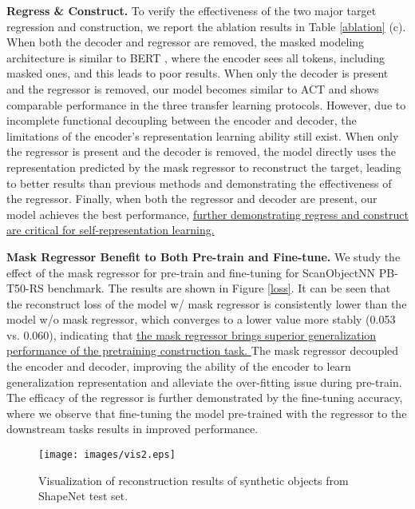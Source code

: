 \documentclass[sigconf, screen]{acmart}
\begin{document}
\noindent \textbf{Regress \& Construct.} 
To verify the effectiveness of the two major target regression and construction, we report the ablation results in Table \ref{ablation} (c). 
When both the decoder and regressor are removed, the masked modeling architecture is similar to BERT \cite{devlin2018bert}, where the encoder sees all tokens, including masked ones, and this leads to poor results.
When only the decoder is present and the regressor is removed, our model becomes similar to ACT \cite{dong2022autoencoders} and shows comparable performance in the three transfer learning protocols. However, due to incomplete functional decoupling between the encoder and decoder, the limitations of the encoder's representation learning ability still exist.
When only the regressor is present and the decoder is removed, the model directly uses the representation predicted by the mask regressor to reconstruct the target, leading to better results than previous methods and demonstrating the effectiveness of the regressor.
Finally, when both the regressor and decoder are present, our model achieves the best performance, \uline{further demonstrating regress and construct are critical for self-representation learning.}




\noindent \textbf{Mask Regressor Benefit to Both Pre-train and Fine-tune.}
We study the effect of the mask regressor for pre-train and fine-tuning for ScanObjectNN PB-T50-RS benchmark.
The results are shown in Figure \ref{loss}.
It can be seen that the reconstruct loss of the model w/ mask regressor is consistently lower than the model w/o mask regressor, which converges to a lower value more stably (0.053 vs. 0.060), indicating that \uline{the mask regressor brings superior generalization performance of the pretraining construction task. }
The mask regressor decoupled the encoder and decoder, improving the ability of the encoder to learn generalization representation and alleviate the over-fitting issue during pre-train.
The efficacy of the regressor is further demonstrated by the fine-tuning accuracy, where we observe that fine-tuning the model pre-trained with the regressor to the downstream tasks results in improved performance.



\begin{figure}[t]
  \centering
  \texttt{[image: images/vis2.eps]}
  \caption{ Visualization of reconstruction results of synthetic objects from ShapeNet test set.}
\label{visualization}
\end{figure}
\end{document}
